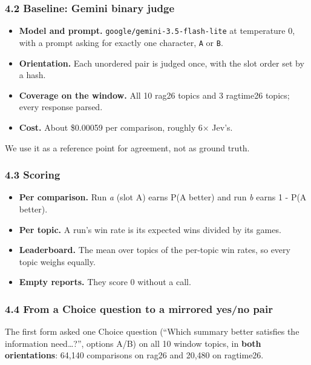 \documentclass[
  10pt,
]{article}
\newcommand{\passthrough}[1]{#1}
\providecommand{\tightlist}{%
  \setlength{\itemsep}{0pt}\setlength{\parskip}{0pt}}
\begin{document}
\subsubsection{4.2 Baseline: Gemini binary
judge}\label{baseline-gemini-binary-judge}

\begin{itemize}
\tightlist
\item
  \textbf{Model and prompt.}
  \passthrough{\lstinline!google/gemini-3.5-flash-lite!} at temperature
  0, with a prompt asking for exactly one character,
  \passthrough{\lstinline!A!} or \passthrough{\lstinline!B!}.
\item
  \textbf{Orientation.} Each unordered pair is judged once, with the
  slot order set by a hash.
\item
  \textbf{Coverage on the window.} All 10 rag26 topics and 3 ragtime26
  topics; every response parsed.
\item
  \textbf{Cost.} About \$0.00059 per comparison, roughly
  6\ensuremath{\times} Jev's.
\end{itemize}

We use it as a reference point for agreement, not as ground truth.

\subsubsection{4.3 Scoring}\label{scoring}

\begin{itemize}
\tightlist
\item
  \textbf{Per comparison.} Run \emph{a} (slot A) earns P(A better) and
  run \emph{b} earns 1 - P(A better).
\item
  \textbf{Per topic.} A run's win rate is its expected wins divided by
  its games.
\item
  \textbf{Leaderboard.} The mean over topics of the per-topic win rates,
  so every topic weighs equally.
\item
  \textbf{Empty reports.} They score 0 without a call.
\end{itemize}

\subsubsection{4.4 From a Choice question to a mirrored yes/no
pair}\label{from-a-choice-question-to-a-mirrored-yesno-pair}

The first form asked one Choice question (``Which summary better
satisfies the information need\ldots?'', options A/B) on all 10 window
topics, in \textbf{both orientations}: 64,140 comparisons on rag26 and
20,480 on ragtime26.
\end{document}
